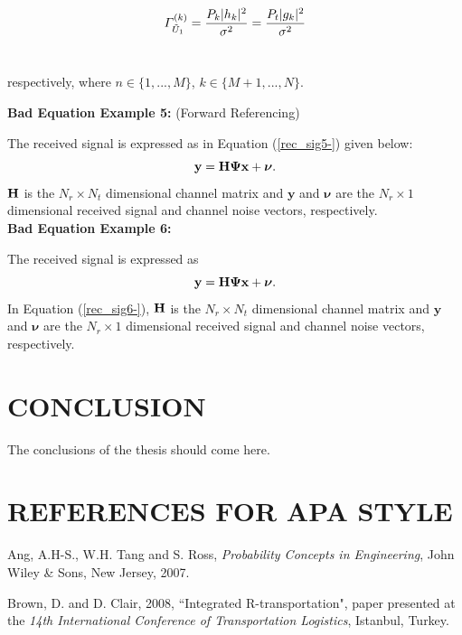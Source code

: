 \documentclass[a4paper,oneside,12pt]{report}
\newcommand{\beq}{\begin{equation} \setlength\abovedisplayskip{5pt} 
\setlength\belowdisplayskip{5pt}}
\newcommand{\eeq}{\end{equation}}
\numberwithin{equation}{chapter}
\begin{document}
\beq \Gamma^{(k)}_{\tilde{U}_1} = \frac{P_{k} |h_{k}|^2}{\sigma^2} = \frac{P_t |g_{k}|^2}{\sigma^2} \eeq\

respectively, where $n \in \{1, ..., M\}$, $k \in \{M+1, ..., N\}$. \


{ \textbf{Bad Equation Example 5:} (Forward Referencing)}

The received signal is expressed as in Equation (\ref{rec_sig5-}) given below:
\beq
\label{rec_sig5-}
{\mathbf y}={\mathbf H}{\bf \Psi}{\mathbf x} + {\bm{\nu}}. 
\eeq
 ${\bf H}$ is the $N_r \times N_t$ dimensional channel matrix and ${\mathbf y}$ and ${\bm{\nu}} $ are the $N_r \times 1$ dimensional received signal and channel noise vectors, respectively. \\


{ \textbf{Bad Equation Example 6:} }

The received signal is expressed as
\beq
\label{rec_sig6-}
{\mathbf y}={\mathbf H}{\bf \Psi}{\mathbf x} + {\bm{\nu}}.
\eeq
 In Equation (\ref{rec_sig6-}), ${\bf H}$ is the $N_r \times N_t$ dimensional channel matrix and ${\mathbf y}$ and ${\bm{\nu}} $ are the $N_r \times 1$ dimensional received signal and channel noise vectors, respectively.



\chapter{CONCLUSION}
\label{chapter:conclusion}

The conclusions of the thesis should come
here.

\nocite{*}
 
 
 
\chapter*{REFERENCES FOR APA STYLE}

\leftskip 5mm \parindent -5mm Ang, A.H-S., W.H. Tang and S. Ross, \textit{Probability Concepts in Engineering}, John Wiley \& Sons, New Jersey, 2007.

\leftskip 5mm \parindent -5mm Brown, D. and D. Clair, 2008, ``Integrated R-transportation", paper presented at the \textit{14th International Conference of Transportation Logistics}, Istanbul, Turkey.
\end{document}
